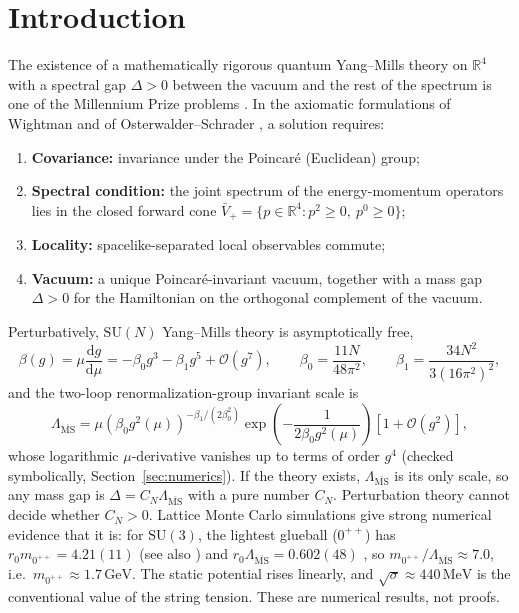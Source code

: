 \documentclass[11pt,a4paper]{amsart}
\theoremstyle{definition}
\newcommand{\R}{\mathbb{R}}
\newcommand{\diff}{\mathrm{d}}
\newcommand{\MSbar}{\overline{\mathrm{MS}}}
\begin{document}
\maketitle

\tableofcontents

\section{Introduction}
The existence of a mathematically rigorous quantum Yang--Mills theory on $\R^4$ with a spectral gap $\Delta > 0$ between the vacuum and the rest of the spectrum is one of the Millennium Prize problems \cite{jaffe2006quantum}. In the axiomatic formulations of Wightman and of Osterwalder--Schrader \cite{wightman1956quantum, osterwalder1973axioms, osterwalder1975axioms}, a solution requires:
\begin{enumerate}[label=(\textbf{A\arabic*})]
    \item \textbf{Covariance:} invariance under the Poincar\'e (Euclidean) group;
    \item \textbf{Spectral condition:} the joint spectrum of the energy-momentum operators lies in the closed forward cone $\bar{V}_+ = \{p \in \R^4 : p^2 \ge 0,\ p^0 \ge 0\}$;
    \item \textbf{Locality:} spacelike-separated local observables commute;
    \item \textbf{Vacuum:} a unique Poincar\'e-invariant vacuum, together with a mass gap $\Delta>0$ for the Hamiltonian on the orthogonal complement of the vacuum.
\end{enumerate}

Perturbatively, $\mathrm{SU}(N)$ Yang--Mills theory is asymptotically free,
\begin{equation}
    \beta(g) = \mu \frac{\diff g}{\diff \mu} = -\beta_0 g^3 - \beta_1 g^5 + \mathcal{O}(g^7), \qquad \beta_0 = \frac{11N}{48\pi^2}, \qquad \beta_1 = \frac{34N^2}{3(16\pi^2)^2},
\end{equation}
and the two-loop renormalization-group invariant scale is
\begin{equation}
    \label{eq:lambda_ms}
    \Lambda_{\MSbar} = \mu \left( \beta_0 g^2(\mu) \right)^{-\beta_1/(2\beta_0^2)} \exp\!\left( - \frac{1}{2\beta_0 g^2(\mu)} \right) \left[ 1 + \mathcal{O}(g^2) \right],
\end{equation}
whose logarithmic $\mu$-derivative vanishes up to terms of order $g^4$ (checked symbolically, Section~\ref{sec:numerics}). If the theory exists, $\Lambda_{\MSbar}$ is its only scale, so any mass gap is $\Delta = C_N \Lambda_{\MSbar}$ with a pure number $C_N$. Perturbation theory cannot decide whether $C_N > 0$. Lattice Monte Carlo simulations give strong numerical evidence that it is: for $\mathrm{SU}(3)$, the lightest glueball ($0^{++}$) has $r_0 m_{0^{++}} = 4.21(11)$ \cite{morningstar1999glueball} (see also \cite{athenodorou2020glueball}) and $r_0\Lambda_{\MSbar} = 0.602(48)$ \cite{capitani1999nonperturbative}, so $m_{0^{++}}/\Lambda_{\MSbar} \approx 7.0$, i.e.\ $m_{0^{++}} \approx 1.7\,\mathrm{GeV}$. The static potential rises linearly, and $\sqrt{\sigma}\approx 440\,\mathrm{MeV}$ is the conventional value of the string tension. These are numerical results, not proofs.
\end{document}
